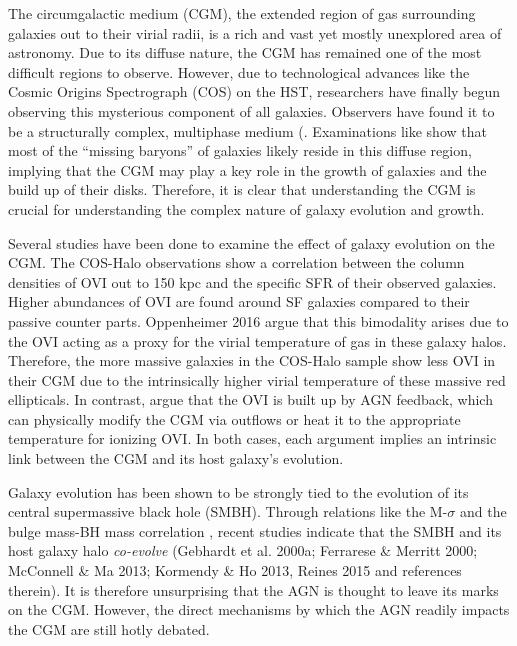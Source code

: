 \documentclass[]{emulateapj}
\begin{document}
The circumgalactic medium (CGM), the extended region of gas surrounding galaxies out to their virial radii, is a rich and vast yet mostly unexplored area of astronomy. Due to its diffuse nature, the CGM has remained one of the most difficult regions to observe. However, due to technological advances like the Cosmic Origins Spectrograph (COS) on the HST, researchers have finally begun observing this mysterious component of all galaxies. Observers have found it to be a structurally complex, multiphase medium (\citep{Tumlinson2011,Werk2012,Werk2013a,Werk2016,Tumlinson2017}. Examinations like \cite{Werk2014} show that most of the ``missing baryons'' of galaxies likely reside in this diffuse region, implying that the CGM may play a key role in the growth of galaxies and the build up of their disks. Therefore, it is clear that understanding the CGM is crucial for understanding the complex nature of galaxy evolution and growth. 

Several studies have been done to examine the effect of galaxy evolution on the CGM. The COS-Halo observations show a correlation between the column densities of OVI out to 150 kpc and the specific SFR of their observed galaxies. Higher abundances of OVI are found around SF galaxies compared to their passive counter parts. Oppenheimer 2016 argue that this bimodality arises due to the OVI acting as a proxy for the virial temperature of gas in these galaxy halos. Therefore, the more massive galaxies in the COS-Halo sample show less OVI in their CGM due to the intrinsically higher virial temperature of these massive red ellipticals. In contrast, \cite{Suresh2017} argue that the OVI is built up by AGN feedback, which can physically modify the CGM via outflows or heat it to the appropriate temperature for ionizing OVI. In both cases, each argument implies an intrinsic link between the CGM and its host galaxy's evolution.

Galaxy evolution has been shown to be strongly tied to the evolution of its central supermassive black hole (SMBH). Through relations like the M-$\sigma$ and the bulge mass-BH mass correlation \citep{Ferrarese2000,Mcconnell2013}, recent studies indicate that the SMBH and its host galaxy halo \textit{co-evolve} (Gebhardt et al. 2000a; Ferrarese \& Merritt 2000; McConnell \& Ma 2013; Kormendy \& Ho 2013, Reines 2015 and references therein).   It is therefore unsurprising that the AGN is thought to leave its marks on the CGM. However, the direct mechanisms by which the AGN readily impacts the CGM are still hotly debated. 
\end{document}

